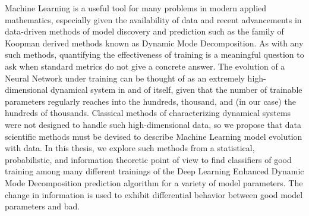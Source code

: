 

Machine Learning is a useful tool for many problems in modern applied mathematics, especially given the
availability of data and recent advancements in data-driven methods of model discovery and prediction such 
as the family of Koopman derived
methods known as Dynamic Mode Decomposition. As with any such methods, quantifying the 
effectiveness of training is a meaningful question to ask when standard metrics do not give a concrete 
answer. The evolution of a Neural Network under training can be thought of as an extremely high-dimensional
dynamical system in and of itself, given that the number of trainable parameters regularly reaches into the 
hundreds, thousand, and (in our case) the hundreds of thousands. Classical methods of characterizing dynamical
systems were not designed to handle such high-dimensional data, so we propose that data scientific methods must 
be devised to describe Machine Learning model evolution with data. In this thesis, we explore such methods 
from a statistical, probabilistic,
and information theoretic point of view to find classifiers of good training among many different trainings
of the Deep Learning Enhanced Dynamic Mode Decomposition prediction algorithm for a variety of model parameters.
The change in information is used to exhibit differential behavior between good model parameters and bad.
